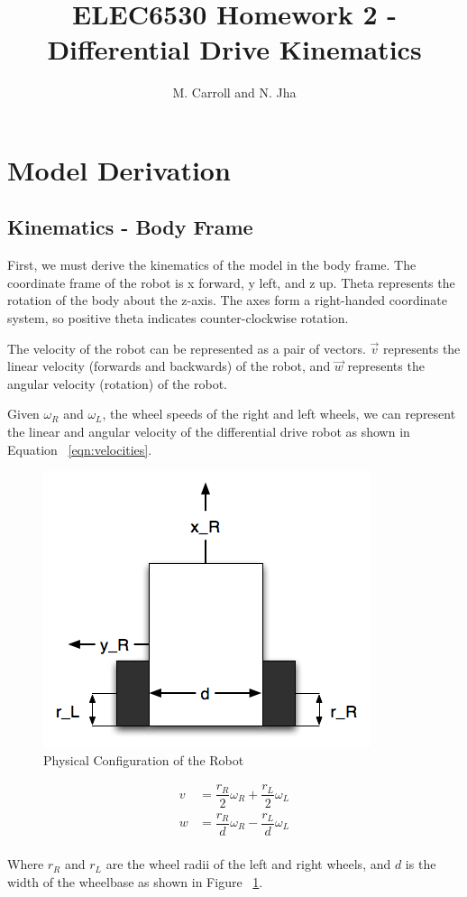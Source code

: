\documentclass[10pt]{article}
\title{ELEC6530 Homework 2 - Differential Drive Kinematics}
\author{M. Carroll and N. Jha}
\date{}
\begin{document}
\maketitle

\section{Model Derivation}
\subsection{Kinematics - Body Frame}
First, we must derive the kinematics of the model in the body frame.  The coordinate frame of the robot is x forward, y left, and z up.  Theta represents the rotation of the body about the z-axis.  
The axes form a right-handed coordinate system, so positive theta indicates counter-clockwise rotation.

The velocity of the robot can be represented as a pair of vectors.  $\vec{v}$ represents the linear velocity (forwards and backwards) of the robot, and $\vec{w}$ represents the angular velocity (rotation)
of the robot.

Given $\omega_{R}$ and $\omega_{L}$, the wheel speeds of the right and left wheels, we can represent the linear and angular velocity of the differential drive robot as shown in Equation ~\ref{eqn:velocities}.

\begin{figure}[h]
 \centering
 \includegraphics[scale=0.5,keepaspectratio=true]{./robot.png}
 \caption{Physical Configuration of the Robot}
 \label{fig:robotparams}
\end{figure}

\begin{equation}
  \begin{aligned}
    v &= \dfrac{r_R}{2} \omega_R + \dfrac{r_L}{2} \omega_L \\
    w &= \dfrac{r_R}{d} \omega_R - \dfrac{r_L}{d} \omega_L
  \end{aligned}
  \label{eqn:velocities}
\end{equation}
\\
Where $r_{R}$ and $r_{L}$ are the wheel radii of the left and right wheels, and $d$ is the width of the wheelbase as shown in Figure ~\ref{fig:robotparams}.
\end{document}
